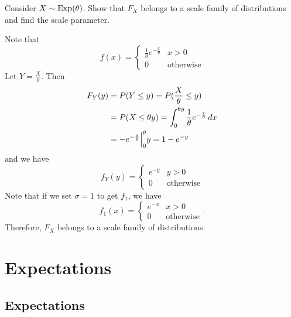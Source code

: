 \documentclass[notoc,notitlepage]{tufte-book}
\begin{document}
\begin{eg}[Example 2.15]\label{eg:3_3_3}
  Consider $X \sim \operatorname{Exp}(\theta)$. Show that $F_X$ belongs to a scale family of distributions and find the scale parameter.

  Note that
  \begin{equation*}
    f(x) = \begin{cases}
      \frac{1}{\theta} e^{- \frac{x}{\theta}} & x > 0 \\
      0                                       & \text{otherwise}
    \end{cases}
  \end{equation*}
  Let $Y = \frac{X}{\theta}$. Then
  \begin{align*}
    F_Y (y) &= P(Y \leq y) = P(\frac{X}{\theta} \leq y) \\
            &= P(X \leq \theta y) = \int_{0}^{\theta y} \frac{1}{\theta} e^{-\frac{x}{\theta}} \mathop{}\!d{x} \\
            &= - e^{- \frac{x}{\theta}} \Big|_{0}^{\theta}{y} = 1 - e^{-y}
  \end{align*}
  and we have
  \begin{equation*}
    f_Y(y) = \begin{cases}
      e^{-y} & y > 0 \\
      0      & \text{otherwise}
    \end{cases}
  \end{equation*}
  Note that if we set $\sigma = 1$ to get $f_1$, we have
  \begin{equation*}
    f_1(x) = \begin{cases}
      e^{-x} & x > 0 \\
      0      & \text{otherwise}
    \end{cases}.
  \end{equation*}
  Therefore, $F_X$ belongs to a scale family of distributions.
\end{eg}


\section{Expectations}%
\label{sec:expectations}

\subsection{Expectations}%
\label{sub:expectations}
\end{document}

